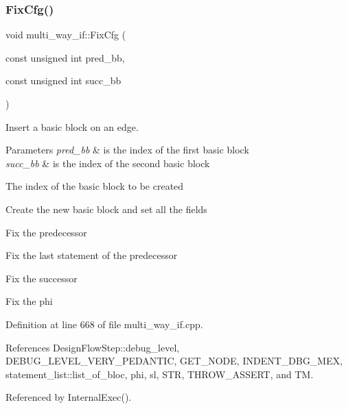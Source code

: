 \mbox{\label{classmulti__way__if_a5d3d9ceeead0ef86f24f33e3bd165c84}} 
\subsubsection{\texorpdfstring{Fix\+Cfg()}{FixCfg()}}
{\footnotesize\ttfamily void multi\+\_\+way\+\_\+if\+::\+Fix\+Cfg (\begin{DoxyParamCaption}\item[{const unsigned int}]{pred\+\_\+bb,  }\item[{const unsigned int}]{succ\+\_\+bb }\end{DoxyParamCaption})\hspace{0.3cm}{\ttfamily [private]}}



Insert a basic block on an edge. 


\begin{DoxyParams}{Parameters}
{\em pred\+\_\+bb} & is the index of the first basic block \\
\hline
{\em succ\+\_\+bb} & is the index of the second basic block \\
\hline
\end{DoxyParams}
The index of the basic block to be created

Create the new basic block and set all the fields

Fix the predecessor

Fix the last statement of the predecessor

Fix the successor

Fix the phi 

Definition at line 668 of file multi\+\_\+way\+\_\+if.\+cpp.



References Design\+Flow\+Step\+::debug\+\_\+level, D\+E\+B\+U\+G\+\_\+\+L\+E\+V\+E\+L\+\_\+\+V\+E\+R\+Y\+\_\+\+P\+E\+D\+A\+N\+T\+IC, G\+E\+T\+\_\+\+N\+O\+DE, I\+N\+D\+E\+N\+T\+\_\+\+D\+B\+G\+\_\+\+M\+EX, statement\+\_\+list\+::list\+\_\+of\+\_\+bloc, phi, sl, S\+TR, T\+H\+R\+O\+W\+\_\+\+A\+S\+S\+E\+RT, and TM.



Referenced by Internal\+Exec().

